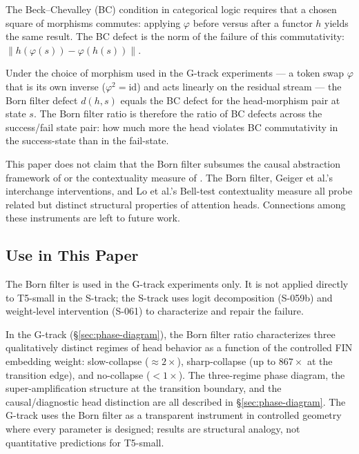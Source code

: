 The Beck--Chevalley (BC) condition in categorical logic requires that a
chosen square of morphisms commutes: applying $\varphi$ before versus after
a functor $h$ yields the same result.
The BC defect is the norm of the failure of this commutativity:
$\|h(\varphi(s)) - \varphi(h(s))\|$.

Under the choice of morphism used in the G-track experiments --- a token swap
$\varphi$ that is its own inverse ($\varphi^2 = \mathrm{id}$) and acts
linearly on the residual stream --- the Born filter defect $d(h, s)$ equals
the BC defect for the head-morphism pair at state $s$.
The Born filter ratio is therefore the ratio of BC defects across the
success/fail state pair: how much more the head violates BC commutativity
in the success-state than in the fail-state.

This paper does not claim that the Born filter subsumes the causal abstraction
framework of \citet{geiger2021causal} or the contextuality measure of
\citet{lo2024contextuality}.
The Born filter, Geiger et al.'s interchange interventions, and Lo et al.'s
Bell-test contextuality measure all probe related but distinct structural
properties of attention heads.
Connections among these instruments are left to future work.

\subsection{Use in This Paper}

The Born filter is used in the G-track experiments only.
It is not applied directly to T5-small in the S-track; the S-track uses logit
decomposition (S-059b) and weight-level intervention (S-061) to characterize
and repair the failure.

In the G-track (\S\ref{sec:phase-diagram}), the Born filter ratio characterizes
three qualitatively distinct regimes of head behavior as a function of the
controlled FIN embedding weight: slow-collapse (${\approx}2\times$),
sharp-collapse (up to $867\times$ at the transition edge), and no-collapse
($<1\times$).
The three-regime phase diagram, the super-amplification structure at the
transition boundary, and the causal/diagnostic head distinction are all
described in \S\ref{sec:phase-diagram}.
The G-track uses the Born filter as a transparent instrument in controlled
geometry where every parameter is designed; results are structural analogy,
not quantitative predictions for T5-small.
